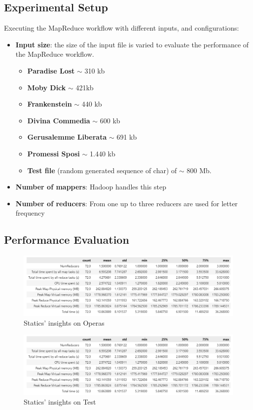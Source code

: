 \documentclass[a4paper, 12pt]{article}
\begin{document}
\subsection{Experimental Setup}
Executing the MapReduce workflow with different inputs, and configurations:
\begin{itemize}
  \item \textbf{Input size}: the size of the input file is varied to evaluate the performance of the MapReduce workflow.
        \begin{itemize}
          \item \textbf{Paradise Lost} $\sim$ 310 kb
          \item \textbf{Moby Dick} $\sim$ 421kb
          \item \textbf{Frankenstein} $\sim$ 440 kb
          \item \textbf{Divina Commedia} $\sim$ 600 kb
          \item \textbf{Gerusalemme Liberata} $\sim$ 691 kb
          \item \textbf{Promessi Sposi} $\sim$ 1.440 kb
          \item \textbf{Test file} (random generated sequence of char) of $\sim$ 800 Mb.
        \end{itemize}
  \item \textbf{Number of mappers}: Hadoop handles this step
  \item \textbf{Number of reducers}: From one up to three reducers are used for letter frequency
\end{itemize}

\subsection{Performance Evaluation}


\begin{figure}[ht!]
  \centering
  \includegraphics[width=\textwidth]{media/performance/opera_df_describe.png}
  \caption{Statics' insights on Operas}
  \label{fig:OperaInsights}
\end{figure}

\begin{figure}[ht!]
  \centering
  \includegraphics[width=\textwidth]{media/performance/opera_df_describe.png}
  \caption{Statics' insights on Test}
  \label{fig:OperaInsightsTEST}
\end{figure}
\end{document}
